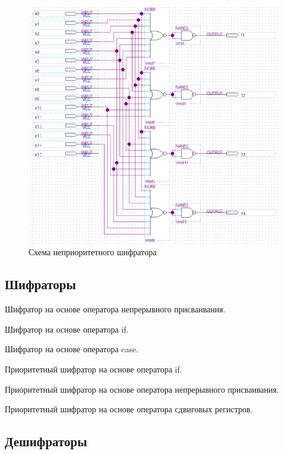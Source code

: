 \documentclass[a4paper,14pt]{article}
\begin{document}
\begin{figure}[H]
	\centering
	\includegraphics[width=0.9\linewidth]{imgs/z1_schema}
	\caption{Схема неприоритетного шифратора}
	\label{fig:z1_schema}
\end{figure}

\subsection{Шифраторы}

Шифратор на основе оператора непрерывного присваивания.

Шифратор на основе оператора if.

Шифратор на основе оператора case.

Приоритетный шифратор на основе оператора if.

Приоритетный шифратор на основе оператора непрерывного присваивания.

Приоритетный шифратор на основе оператора сдвиговых регистров.

\subsection{Дешифраторы}

\end{document}
